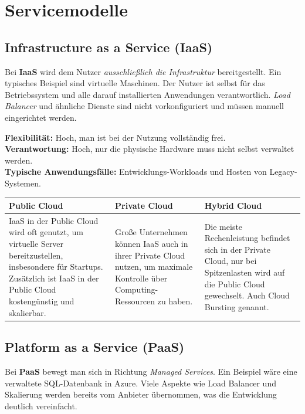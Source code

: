 \section{Servicemodelle}

\subsection{Infrastructure as a Service (IaaS)}
Bei \textbf{IaaS} wird dem Nutzer \emph{ausschließlich die Infrastruktur} bereitgestellt.
Ein typisches Beispiel sind virtuelle Maschinen. Der Nutzer ist selbst für
das Betriebssystem und alle darauf installierten Anwendungen verantwortlich.
\textit{Load Balancer} und ähnliche Dienste sind nicht vorkonfiguriert und müssen
manuell eingerichtet werden.

\textbf{Flexibilität:} Hoch, man ist bei der Nutzung vollständig frei.\\
\textbf{Verantwortung:} Hoch, nur die physische Hardware muss nicht selbst
verwaltet werden.\\
\textbf{Typische Anwendungsfälle:} Entwicklungs-Workloads und Hosten von
Legacy-Systemen.
\begin{table}[h]
    \centering
    \begin{tabularx}{\linewidth}{|X|X|X|}
        \hline
        \textbf{Public Cloud} & \textbf{Private Cloud} & \textbf{Hybrid Cloud} \\
        \hline
        IaaS in der Public Cloud wird oft genutzt, um virtuelle Server bereitzustellen, insbesondere für Startups. Zusätzlich ist IaaS in der Public Cloud kostengünstig und skalierbar. & Große Unternehmen können IaaS auch in ihrer Private Cloud nutzen, um maximale Kontrolle über Computing-Ressourcen zu haben. & Die meiste Rechenleistung befindet sich in der Private Cloud, nur bei Spitzenlasten wird auf die Public Cloud gewechselt. Auch Cloud Bursting genannt. \\
        \hline
    \end{tabularx}
\end{table}
\subsection{Platform as a Service (PaaS)}
Bei \textbf{PaaS} bewegt man sich in Richtung \textit{Managed Services}. Ein Beispiel wäre
eine verwaltete SQL-Datenbank in Azure. Viele Aspekte wie Load Balancer und
Skalierung werden bereits vom Anbieter übernommen, was die Entwicklung
deutlich vereinfacht.

